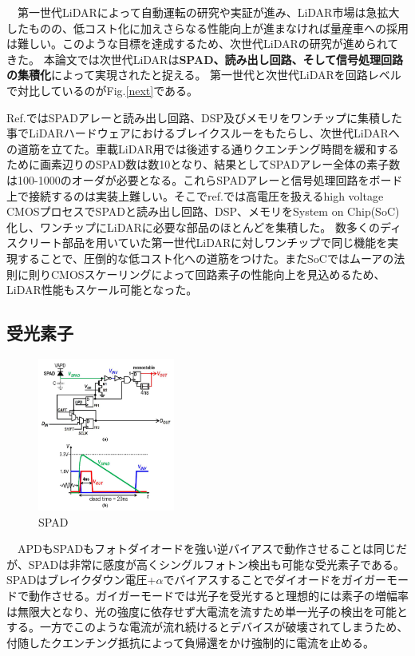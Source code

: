 \documentclass[twocolumn, 11pt, a4j]{article}
\begin{document}
　第一世代LiDARによって自動運転の研究や実証が進み、LiDAR市場は急拡大したものの、低コスト化に加えさらなる性能向上が進まなければ量産車への採用は難しい。このような目標を達成するため、次世代LiDARの研究が進められてきた。
本論文では次世代LiDARは\textbf{SPAD、読み出し回路、そして信号処理回路の集積化}によって実現されたと捉える。
第一世代と次世代LiDARを回路レベルで対比しているのがFig.\ref{next}である。

Ref.\cite{niclass2012100}ではSPADアレーと読み出し回路、DSP及びメモリをワンチップに集積した事でLiDARハードウェアにおけるブレイクスルーをもたらし、次世代LiDARへの道筋を立てた。車載LiDAR用では後述する通りクエンチング時間を緩和するために画素辺りのSPAD数は数10となり、結果としてSPADアレー全体の素子数は100-1000のオーダが必要となる。これらSPADアレーと信号処理回路をボード上で接続するのは実装上難しい。そこでref.\cite{niclass2012100}では高電圧を扱えるhigh voltage CMOSプロセスでSPADと読み出し回路、DSP、メモリをSystem on Chip(SoC)化し、ワンチップにLiDARに必要な部品のほとんどを集積した。
数多くのディスクリート部品を用いていた第一世代LiDARに対しワンチップで同じ機能を実現することで、圧倒的な低コスト化への道筋をつけた。またSoCではムーアの法則に則りCMOSスケーリングによって回路素子の性能向上を見込めるため、LiDAR性能もスケール可能となった。

\subsection{受光素子}
\begin{figure}[!t]
\centering
 \includegraphics[width=0.4\textwidth]{figs/spad.png}
  \caption{SPAD \cite{niclass2012100}}
\label{spad}
\end{figure}

　APDもSPADもフォトダイオードを強い逆バイアスで動作させることは同じだが、SPADは非常に感度が高くシングルフォトン検出も可能な受光素子である\cite{niclass2005design}。SPADはブレイクダウン電圧+$\alpha$でバイアスすることでダイオードをガイガーモードで動作させる。ガイガーモードでは光子を受光すると理想的には素子の増幅率は無限大となり、光の強度に依存せず大電流を流すため単一光子の検出を可能とする。一方でこのような電流が流れ続けるとデバイスが破壊されてしまうため、付随したクエンチング抵抗によって負帰還をかけ強制的に電流を止める。
\end{document}
